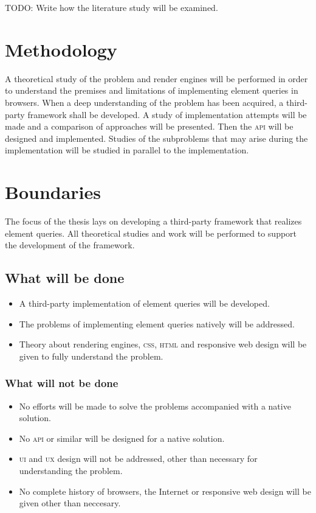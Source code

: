 \documentclass[oneside,a4paper,11pt]{kth-mag}
\begin{document}
TODO: Write how the literature study will be examined.

\section*{Methodology}
A theoretical study of the problem and render engines will be performed in order to understand the premises and limitations of implementing element queries in browsers. When a deep understanding of the problem has been acquired, a third-party framework shall be developed. A study of implementation attempts will be made and a comparison of approaches will be presented. Then the \textsc{api} will be designed and implemented. Studies of the subproblems that may arise during the implementation will be studied in parallel to the implementation.

\section*{Boundaries}
The focus of the thesis lays on developing a third-party framework that realizes element queries. All theoretical studies and work will be performed to support the development of the framework.

\subsection*{What will be done}
\begin{itemize}
\item A third-party implementation of element queries will be developed.
\item The problems of implementing element queries natively will be addressed.
\item Theory about rendering engines, \textsc{css}, \textsc{html} and responsive web design will be given to fully understand the problem.
\end{itemize}

\subsubsection*{What will not be done}
\begin{itemize}
\item No efforts will be made to solve the problems accompanied with a native solution.
\item No \textsc{api} or similar will be designed for a native solution.
\item \textsc{ui} and \textsc{ux} design will not be addressed, other than necessary for understanding the problem.
\item No complete history of browsers, the Internet or responsive web design will be given other than neccesary.
\end{itemize}
\end{document}
